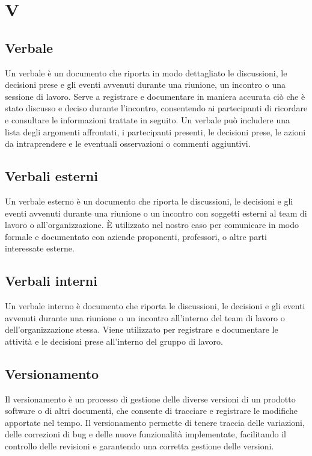 \section{V} 
\subsection{Verbale} 
Un verbale è un documento che riporta in modo dettagliato le discussioni, le decisioni prese e gli eventi avvenuti durante una riunione, un incontro o una sessione di lavoro. Serve a registrare e documentare in maniera accurata ciò che è stato discusso e deciso durante l'incontro, consentendo ai partecipanti di ricordare e consultare le informazioni trattate in seguito. Un verbale può includere una lista degli argomenti affrontati, i partecipanti presenti, le decisioni prese, le azioni da intraprendere e le eventuali osservazioni o commenti aggiuntivi. 
\subsection{Verbali esterni} 
Un verbale esterno è un documento che riporta le discussioni, le decisioni e gli eventi avvenuti durante una riunione o un incontro con soggetti esterni al team di lavoro o all'organizzazione. È utilizzato nel nostro caso per comunicare in modo formale e documentato con aziende proponenti, professori, o altre parti interessate esterne.
\subsection{Verbali interni} 
Un verbale interno è documento che riporta le discussioni, le decisioni e gli eventi avvenuti durante una riunione o un incontro all'interno del team di lavoro o dell'organizzazione stessa. Viene utilizzato per registrare e documentare le attività e le decisioni prese all'interno del gruppo di lavoro.
\subsection{Versionamento} 
Il versionamento è un processo di gestione delle diverse versioni di un prodotto software o di altri documenti, che consente di tracciare e registrare le modifiche apportate nel tempo. Il versionamento permette di tenere traccia delle variazioni, delle correzioni di bug e delle nuove funzionalità implementate, facilitando il controllo delle revisioni e garantendo una corretta gestione delle versioni. 
